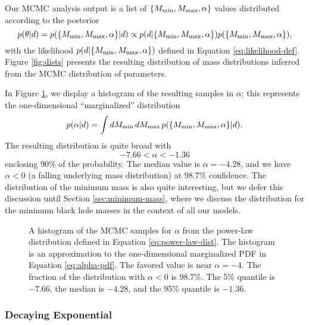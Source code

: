 \documentclass[preprint]{aastex}
\newcommand{\Mmin}{M_{\textnormal{min}}}
\newcommand{\Mmax}{M_{\textnormal{max}}}
\begin{document}
Our MCMC analysis output is a list of $\{\Mmin, \Mmax, \alpha\}$
values distributed according to the posterior 
\begin{equation}
  p(\theta|d) = p(\{\Mmin, \Mmax, \alpha\}|d) \propto p(d|\{\Mmin,
  \Mmax, \alpha\}) p(\{\Mmin, \Mmax, \alpha\}),
\end{equation}
with the likelihood $p(d|\{\Mmin, \Mmax, \alpha\})$ defined in
Equation \eqref{eq:likelihood-def}.  Figure \ref{fig:dists} presents
the resulting distribution of mass distributions inferred from the
MCMC distribution of parameters.

In Figure \ref{fig:alpha}, we display a histogram of the resulting
samples in $\alpha$; this represents the one-dimensional
``marginalized'' distribution
\begin{equation}
  \label{eq:alpha-pdf}
  p(\alpha|d) = \int d\Mmin\, d\Mmax\, p(\{\Mmin, \Mmax, \alpha\}|d).
\end{equation}
The resulting distribution is quite broad with 
\begin{equation}
  -7.66 < \alpha < -1.36
\end{equation}
enclosing 90\% of the probability.  The median value is $\alpha =
-4.28$, and we have $\alpha < 0$ (a falling underlying mass
distribution) at 98.7\% confidence.  The distribution of the minimum
mass is also quite interesting, but we defer this discussion until
Section \ref{sec:minimum-mass}, where we discuss the distribution for
the minimum black hole masses in the context of all our models.

\begin{figure}
  \begin{center}
  \end{center}
  \caption{\label{fig:alpha} A histogram of the MCMC samples for
    $\alpha$ from the power-law distribution defined in Equation
    \eqref{eq:power-law-dist}.  The histogram is an approximation to
    the one-dimensional marginalized PDF in Equation
    \eqref{eq:alpha-pdf}.  The favored value is near $\alpha = -4$.
    The fraction of the distribution with $\alpha < 0$ is 98.7\%.  The
    5\% quantile is $-7.66$, the median is $-4.28$, and the 95\%
    quantile is $-1.36$.}
\end{figure}

\subsubsection{Decaying Exponential}
\label{subsubsec:exponential}
\end{document}
